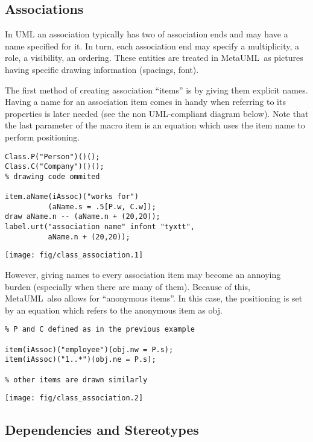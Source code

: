 \documentclass{article}
\newcommand{\code}{\ttfamily}
\newcommand{\metauml}{MetaUML}
\begin{document}
\subsection{Associations}
In UML an association typically has two of association ends and may have a name specified for it.
In turn, each association end may specify a multiplicity, a role, a visibility, an ordering.
These entities are treated in \metauml\ as pictures having specific drawing information
(spacings, font).

The first method of creating association ``items'' is by giving them explicit names.
Having a name for an association item comes in handy when referring to its properties
is later needed (see the non UML-compliant diagram below). Note that the last parameter of the macro {\code item} is an equation which uses the item name to perform positioning.

\begin{multicols}{2}
\begin{verbatim}
Class.P("Person")()();
Class.C("Company")()();
% drawing code ommited

item.aName(iAssoc)("works for")
          (aName.s = .5[P.w, C.w]);
draw aName.n -- (aName.n + (20,20));
label.urt("association name" infont "tyxtt",
          aName.n + (20,20));
\end{verbatim}
\columnbreak
\hspace{1cm}\texttt{[image: fig/class\_association.1]}
\end{multicols}

However, giving names to every association item may become an annoying burden
(especially when there are many of them). Because of this, \metauml\ also allows for
``anonymous items''. In this case, the positioning is set by an equation
which refers to the anonymous item as {\code obj}.

\begin{multicols}{2}
\begin{verbatim}
% P and C defined as in the previous example

item(iAssoc)("employee")(obj.nw = P.s);
item(iAssoc)("1..*")(obj.ne = P.s);

% other items are drawn similarly
\end{verbatim}
\columnbreak
\hspace{3cm}\texttt{[image: fig/class\_association.2]}
\end{multicols}

\subsection{Dependencies and Stereotypes}
\end{document}
